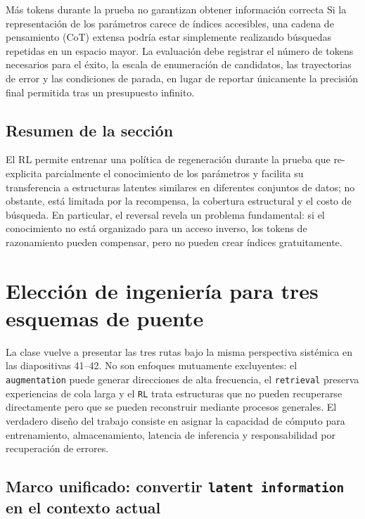 \documentclass[a4paper]{article}
\begin{document}
\begin{warningbox}{Más tokens durante la prueba no garantizan obtener información correcta}
Si la representación de los parámetros carece de índices accesibles, una cadena de pensamiento (CoT) extensa podría estar simplemente realizando búsquedas repetidas en un espacio mayor. La evaluación debe registrar el número de tokens necesarios para el éxito, la escala de enumeración de candidatos, las trayectorias de error y las condiciones de parada, en lugar de reportar únicamente la precisión final permitida tras un presupuesto infinito.
\end{warningbox}

\subsection{Resumen de la sección}

El RL permite entrenar una política de regeneración durante la prueba que re-explicita parcialmente el conocimiento de los parámetros y facilita su transferencia a estructuras latentes similares en diferentes conjuntos de datos; no obstante, está limitada por la recompensa, la cobertura estructural y el costo de búsqueda. En particular, el reversal revela un problema fundamental: si el conocimiento no está organizado para un acceso inverso, los tokens de razonamiento pueden compensar, pero no pueden crear índices gratuitamente.
\section{Elección de ingeniería para tres esquemas de puente}

La clase vuelve a presentar las tres rutas bajo la misma perspectiva sistémica en las diapositivas 41--42. No son enfoques mutuamente excluyentes: el \texttt{augmentation} puede generar direcciones de alta frecuencia, el \texttt{retrieval} preserva experiencias de cola larga y el \texttt{RL} trata estructuras que no pueden recuperarse directamente pero que se pueden reconstruir mediante procesos generales. El verdadero diseño del trabajo consiste en asignar la capacidad de cómputo para entrenamiento, almacenamiento, latencia de inferencia y responsabilidad por recuperación de errores.

\subsection{Marco unificado: convertir \texttt{latent information} en el contexto actual}
\end{document}
